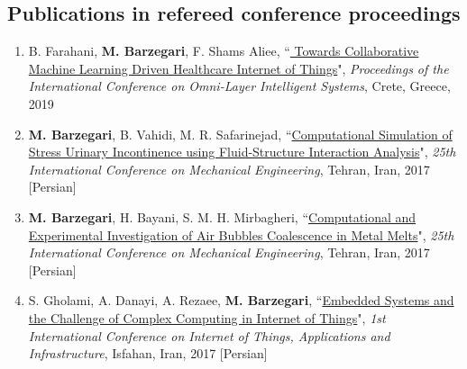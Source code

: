 \documentclass{cv}
\begin{document}
\subsection{Publications in refereed conference proceedings}
\begin{enumerate}
\item
B. Farahani, \textbf{M. Barzegari}, F. Shams Aliee, ``\href{https://dl.acm.org/citation.cfm?id=3312644}{
Towards Collaborative Machine Learning Driven Healthcare Internet of Things}", \textit{Proceedings of the International Conference on Omni-Layer Intelligent Systems}, Crete, Greece, 2019 
\item
\textbf{M. Barzegari}, B. Vahidi, M. R. Safarinejad, ``\href{https://www.civilica.com/Paper-ISME25-ISME25_342=\%D8\%B4\%D8\%A8\%DB\%8C\%D9\%87-\%D8\%B3\%D8\%A7\%D8\%B2\%DB\%8C-\%D9\%85\%D8\%AD\%D8\%A7\%D8\%B3\%D8\%A8\%D8\%A7\%D8\%AA\%DB\%8C-\%D8\%A8\%DB\%8C-\%D8\%A7\%D8\%AE\%D8\%AA\%DB\%8C\%D8\%A7\%D8\%B1\%DB\%8C-\%D8\%A7\%D8\%B3\%D8\%AA\%D8\%B1\%D8\%B3\%DB\%8C-\%D8\%A7\%D8\%AF\%D8\%B1\%D8\%A7\%D8\%B1-\%D8\%A8\%D8\%A7-\%D8\%A7\%D8\%B3\%D8\%AA\%D9\%81\%D8\%A7\%D8\%AF\%D9\%87-\%D8\%A7\%D8\%B2-\%D8\%B1\%D9\%88\%D8\%B4-\%D8\%AA\%D8\%AD\%D9\%84\%DB\%8C\%D9\%84-\%D8\%A8\%D8\%B1\%D9\%87\%D9\%85\%DA\%A9\%D9\%86\%D8\%B4-\%D8\%B3\%DB\%8C\%D8\%A7\%D9\%84-\%D9\%88-\%D8\%AC\%D8\%A7\%D9\%85\%D8\%AF.html}{Computational Simulation of Stress Urinary Incontinence using Fluid-Structure Interaction Analysis}", \textit{25th International Conference on Mechanical Engineering}, Tehran, Iran, 2017 [Persian]
\item
\textbf{M. Barzegari}, H. Bayani, S. M. H. Mirbagheri, ``\href{https://www.civilica.com/Paper-ISME25-ISME25_710=\%D8\%A8\%D8\%B1\%D8\%B1\%D8\%B3\%DB\%8C-\%D9\%85\%D8\%AD\%D8\%A7\%D8\%B3\%D8\%A8\%D8\%A7\%D8\%AA\%DB\%8C-\%D9\%88-\%D8\%A2\%D8\%B2\%D9\%85\%D8\%A7\%DB\%8C\%D8\%B4\%DA\%AF\%D8\%A7\%D9\%87\%DB\%8C-\%D8\%A7\%D8\%AF\%D8\%BA\%D8\%A7\%D9\%85-\%D8\%AD\%D8\%A8\%D8\%A7\%D8\%A8-\%D9\%87\%D8\%A7\%DB\%8C-\%D9\%87\%D9\%88\%D8\%A7-\%D8\%AF\%D8\%B1-\%D9\%85\%D8\%B0\%D8\%A7\%D8\%A8-\%D9\%81\%D9\%84\%D8\%B2\%DB\%8C.html}{Computational and Experimental Investigation of Air Bubbles Coalescence in Metal Melts}", \textit{25th International Conference on Mechanical Engineering}, Tehran, Iran, 2017 [Persian]
\item
S. Gholami, A. Danayi, A. Rezaee, \textbf{M. Barzegari}, ``\href{https://www.civilica.com/Paper-IOTCONF01-IOTCONF01_014=\%D8\%B3\%DB\%8C\%D8\%B3\%D8\%AA\%D9\%85-\%D9\%86\%D9\%87\%D9\%81\%D8\%AA\%D9\%87-\%D9\%88-\%DA\%86\%D8\%A7\%D9\%84\%D8\%B4-\%D9\%85\%D8\%AD\%D8\%A7\%D8\%B3\%D8\%A8\%D8\%A7\%D8\%AA-\%D9\%BE\%DB\%8C\%DA\%86\%DB\%8C\%D8\%AF\%D9\%87-\%D8\%AF\%D8\%B1-\%D8\%A7\%DB\%8C\%D9\%86\%D8\%AA\%D8\%B1\%D9\%86\%D8\%AA-\%D8\%A7\%D8\%B4\%DB\%8C\%D8\%A7.html}{Embedded Systems and the Challenge of Complex Computing in Internet of Things}", \textit{1st International Conference on Internet of Things, Applications and Infrastructure}, Isfahan, Iran, 2017 [Persian]
\end{enumerate}
\end{document}
